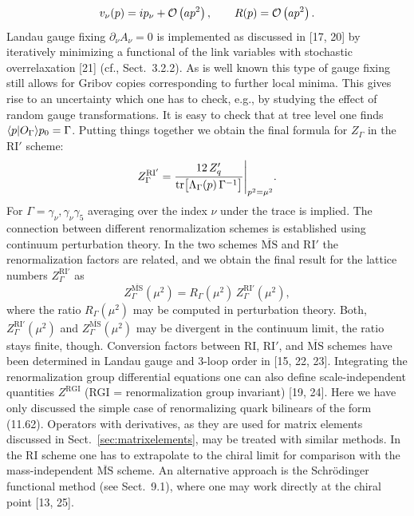 \begin{equation}
v_\nu(p) = i p_\nu + \mathcal{O}\left(ap^2\right) , \qquad
R(p) = \mathcal{O}\left(ap^2\right) .
\end{equation}
Landau gauge fixing $\partial_\nu A_\nu = 0$ is implemented as discussed in [17, 20] by iteratively minimizing a functional of the link variables with stochastic overrelaxation [21] (cf., Sect.~3.2.2). As is well known this type of gauge fixing still
allows for Gribov copies corresponding to further local minima. This gives
rise to an uncertainty which one has to check, e.g., by studying the effect of
random gauge transformations.
It is easy to check that at tree level one finds $\langle p|O_\Gamma\rangle{p}_0 = \Gamma$. Putting
things together we obtain the final formula for $Z_\Gamma$ in the RI$'$ scheme:
\begin{equation}
Z_\Gamma^{\mathrm{RI}'} = \frac{12\,Z_q'}{\operatorname{tr}\bigl[\Lambda_\Gamma(p)\,\Gamma^{-1}\bigr]}
\Bigg|_{p^2 = \mu^2} .
\end{equation}
For $\Gamma = \gamma_\nu, \gamma_\nu\gamma_5$ averaging over the index $\nu$ under the trace is implied.
The connection between different renormalization schemes is established
using continuum perturbation theory. In the two schemes $\overline{\mathrm{MS}}$ and RI$'$ the
renormalization factors are related, and we obtain the final result for the
lattice numbers $Z_\Gamma^{\mathrm{RI}'}$ as
\begin{equation}
Z_\Gamma^{\overline{\mathrm{MS}}}(\mu^2) = R_\Gamma(\mu^2)\, Z_\Gamma^{\mathrm{RI}'}(\mu^2) ,
\end{equation}
where the ratio $R_\Gamma(\mu^2)$ may be computed in perturbation theory. Both,
$Z_\Gamma^{\mathrm{RI}'}(\mu^2)$ and $Z_\Gamma^{\overline{\mathrm{MS}}}(\mu^2)$ may be divergent in the continuum limit, the ratio
stays finite, though.
Conversion factors between RI, RI$'$, and $\overline{\mathrm{MS}}$ schemes have been determined in Landau gauge and 3-loop order in [15, 22, 23]. Integrating the renormalization group differential equations one can also define scale-independent
quantities $Z^{\mathrm{RGI}}$ (RGI = renormalization group invariant) [19, 24].
Here we have only discussed the simple case of renormalizing quark bilinears of the form (11.62). Operators with derivatives, as they are used for
matrix elements discussed in Sect.~\ref{sec:matrixelements}, may be treated with similar methods.
In the RI scheme one has to extrapolate to the chiral limit for comparison with the mass-independent $\overline{\mathrm{MS}}$ scheme. An alternative approach is the
Schr\"odinger functional method (see Sect.~9.1), where one may work directly
at the chiral point [13, 25].


